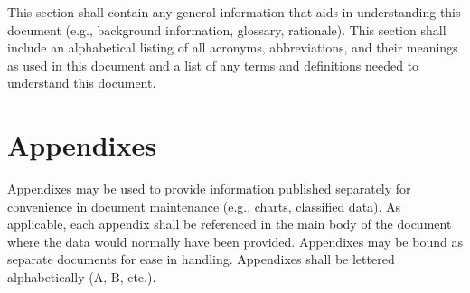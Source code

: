 \documentclass{fidata-report-template}
\begin{document}
This section shall contain any general information that aids in
understanding this document (e.g., background information, glossary,
rationale). This section shall include an alphabetical listing of all
acronyms, abbreviations, and their meanings as used in this document and
a list of any terms and definitions needed to understand this document.

\appendix

\section{Appendixes}

Appendixes may be used to provide information published separately for
convenience in document maintenance (e.g., charts, classified data). As
applicable, each appendix shall be referenced in the main body of the
document where the data would normally have been provided. Appendixes
may be bound as separate documents for ease in handling. Appendixes
shall be lettered alphabetically (A, B, etc.).
\end{document}
